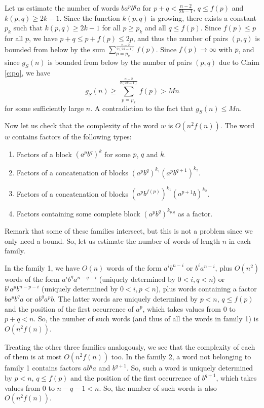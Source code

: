 \documentclass[runningheads,envcountsect,envcountsame]{llncs}
\begin{document}
\medskip

Let us estimate the number of words $ba^p b^q a$ for $p+q<\frac{n-2}{2k-1}$,
$q\leq f(p)$ and $k(p,q)\geq 2k-1$. Since the function $k(p,q)$ is growing, there exists a constant $p_k$ such that $k(p,q)\geq 2k-1$ for all $p \geq p_k$ and all $q\leq f(p)$. Since $f(p)\leq p$ for all $p$, we have $p+q \leq p+f(p) \leq 2p$, and thus the number of pairs $(p,q)$ is bounded from below by the sum $\displaystyle \sum_{p=p_k}^\frac{n-2}{2(2k-1)} f(p)$. Since $f(p) \to \infty$ with $p$, and since $g_S(n)$ is bounded from below by the number of pairs $(p,q)$ due to Claim \ref{c:pq}, we have
\[g_S(n)\geq \sum_{p=p_k}^\frac{n-2}{2(2k-1)} f(p) > Mn\]
for some sufficiently large $n$. A contradiction to the fact that $g_S(n)\leq Mn$.

\medskip
Now let us check that the complexity of the word $w$ is $O(n^2 f(n))$. The
word $w$ contains factors of the following types:

\begin{enumerate}

\item Factors of a block $(a^{p}b^{q})^k$ for some $p$, $q$ and $k$.

\item Factors of a concatenation of blocks $(a^{p}b^{q})^{k_1}(a^{p}b^{q+1})^{k_{2}}$.

\item Factors of a concatenation of blocks $(a^{p}b^{f(p)})^{k_1}(a^{p+1}b)^{k_{2}}$.

\item Factors containing some complete block  $(a^{p}b^{q})^{k_{p,q}}$ as a factor.
\end{enumerate}
Remark that some of these families intersect, but this is not a
problem since we only need a bound. So, let us estimate the number
of words of length $n$ in each family.

In the family 1, we have $O(n)$ words of the form $a^ib^{n-i}$ or $b^ia^{n-i}$, plus $O(n^2)$ words of the form $a^i b^q a^{n-q-i}$ (uniquely determined by $0<i,q<n$) or $b^i a^p b^{n-p-i}$ (uniquely determined by $0<i,p<n$), plus words containing a factor $b a^p b^q a$ or $a b^q a^p b$. The latter words are uniquely determined by $p<n$, $q \leq f(p)$ and the position of the first occurrence of $a^p$, which takes values from 0 to $p+q<n$. So, the number of such words (and thus of all the words in family 1) is $O(n^2f(n))$.

Treating the other three families analogously, we see that the complexity of each of them is at most $O(n^2f(n))$ too.
\iffalse
In the family 2, a word not belonging to family 1 contains factors $a b^q a$ and $b^{q+1}$. So, such a word is uniquely determined by $p<n$, $q \leq f(p)$ and the position of the first occurrence of $b^{q+1}$, which takes values from 0 to $n-q-1<n$. So, the number of such words is also $O(n^2f(n))$.
\end{document}
